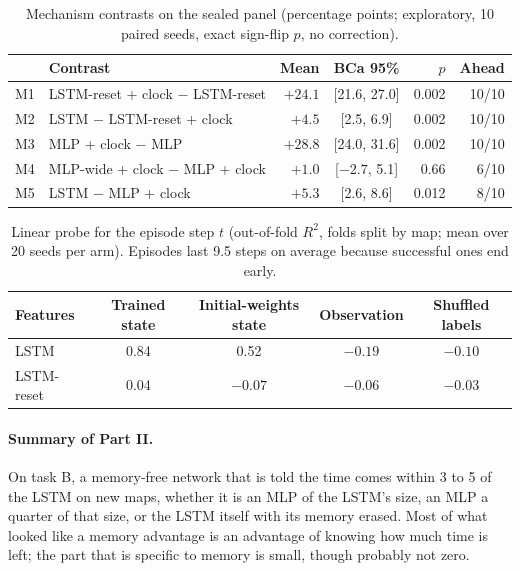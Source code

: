 \begin{table}[t]
  \centering
  \caption{Mechanism contrasts on the sealed panel (percentage points; exploratory, 10 paired
  seeds, exact sign-flip $p$, no correction).}
  \label{tab:mechanism}
  \small
  \begin{tabular}{llrcrr}
    \toprule
    & Contrast & Mean & BCa 95\% & $p$ & Ahead \\
    \midrule
    M1 & LSTM-reset + clock $-$ LSTM-reset & $+24.1$ & [21.6, 27.0] & 0.002 & 10/10 \\
    M2 & LSTM $-$ LSTM-reset + clock & $+4.5$ & [2.5, 6.9] & 0.002 & 10/10 \\
    M3 & MLP + clock $-$ MLP & $+28.8$ & [24.0, 31.6] & 0.002 & 10/10 \\
    M4 & MLP-wide + clock $-$ MLP + clock & $+1.0$ & [$-2.7$, 5.1] & 0.66 & 6/10 \\
    M5 & LSTM $-$ MLP + clock & $+5.3$ & [2.6, 8.6] & 0.012 & 8/10 \\
    \bottomrule
  \end{tabular}
\end{table}

\begin{table}[t]
  \centering
  \caption{Linear probe for the episode step $t$ (out-of-fold $R^2$, folds split by map; mean
  over 20 seeds per arm). Episodes last 9.5 steps on average because successful ones end early.}
  \label{tab:probe}
  \small
  \begin{tabular}{lcccc}
    \toprule
    Features & Trained state & Initial-weights state & Observation & Shuffled labels \\
    \midrule
    LSTM & 0.84 & 0.52 & $-0.19$ & $-0.10$ \\
    LSTM-reset & 0.04 & $-0.07$ & $-0.06$ & $-0.03$ \\
    \bottomrule
  \end{tabular}
\end{table}

\paragraph{Summary of Part II.}
On task B, a memory-free network that is told the time comes within 3 to 5\pp{} of the LSTM on
new maps, whether it is an MLP of the LSTM's size, an MLP a quarter of that size, or the LSTM itself
with its memory erased. Most of what looked like a memory advantage is an advantage of knowing how
much time is left; the part that is specific to memory is small, though probably not zero.

